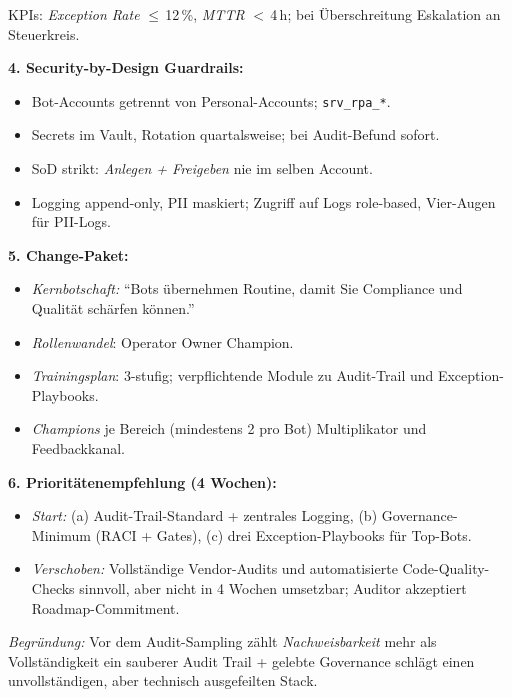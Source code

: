 \documentclass[11pt,a4paper,oneside]{article}
\begin{document}
\begin{loesungbox}
\smallskip
KPIs: \emph{Exception Rate} $\leq$\,12\,\%, \emph{MTTR} $<$\,4\,h; bei \"Uberschreitung Eskalation an Steuerkreis.

\smallskip
\textbf{4. Security-by-Design Guardrails:}
\begin{itemize}
  \item Bot-Accounts getrennt von Personal-Accounts; \texttt{srv\_rpa\_*}.
  \item Secrets im Vault, Rotation quartalsweise; bei Audit-Befund sofort.
  \item SoD strikt: \emph{Anlegen + Freigeben} nie im selben Account.
  \item Logging append-only, PII maskiert; Zugriff auf Logs role-based, Vier-Augen f\"ur PII-Logs.
\end{itemize}

\smallskip
\textbf{5. Change-Paket:}
\begin{itemize}
  \item \emph{Kernbotschaft:} ``Bots \"ubernehmen Routine, damit Sie Compliance und Qualit\"at sch\"arfen k\"onnen.''
  \item \emph{Rollenwandel}: Operator \textrightarrow{} Owner \textrightarrow{} Champion.
  \item \emph{Trainingsplan}: 3-stufig; verpflichtende Module zu Audit-Trail und Exception-Playbooks.
  \item \emph{Champions} je Bereich (mindestens 2 pro Bot) \textendash{} Multiplikator und Feedbackkanal.
\end{itemize}

\smallskip
\textbf{6. Priorit\"atenempfehlung (4 Wochen):}
\begin{itemize}
  \item \emph{Start:} (a) Audit-Trail-Standard + zentrales Logging, (b) Governance-Minimum (RACI + Gates), (c) drei Exception-Playbooks f\"ur Top-Bots.
  \item \emph{Verschoben:} Vollst\"andige Vendor-Audits und automatisierte Code-Quality-Checks \textendash{} sinnvoll, aber nicht in 4 Wochen umsetzbar; Auditor akzeptiert Roadmap-Commitment.
\end{itemize}
\emph{Begr\"undung:} Vor dem Audit-Sampling z\"ahlt \emph{Nachweisbarkeit} mehr als Vollst\"andigkeit \textendash{} ein sauberer Audit Trail + gelebte Governance schl\"agt einen unvollst\"andigen, aber technisch ausgefeilten Stack.
\end{loesungbox}

\clearpage

\end{document}
